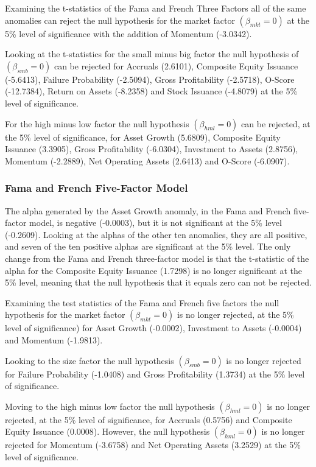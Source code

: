 \documentclass[12pt, a4paper, oneside]{article}
\begin{document}
Examining the t-statistics of the Fama and French Three Factors all of the same anomalies can reject the null hypothesis for the market factor $(\beta_{mkt}= 0)$ at the 5\% level of significance with the addition of Momentum (-3.0342). 

Looking at the t-statistics for the small minus big factor the null hypothesis of $(\beta_{smb}= 0)$ can be rejected for Accruals (2.6101), Composite Equity Issuance (-5.6413), Failure Probability (-2.5094), Gross Profitability (-2.5718), O-Score (-12.7384), Return on Assets (-8.2358) and Stock Issuance (-4.8079) at the 5\% level of significance. 

For the high minus low factor the null hypothesis $(\beta_{hml}= 0)$ can be rejected, at the 5\% level of significance, for Asset Growth (5.6809), Composite Equity Issuance (3.3905), Gross Profitability (-6.0304), Investment to Assets (2.8756), Momentum (-2.2889), Net Operating Assets (2.6413) and O-Score (-6.0907).

\subsubsection{Fama and French Five-Factor Model}
The alpha generated by the Asset Growth anomaly, in the Fama and French five-factor model, is negative (-0.0003), but it is not significant at the 5\% level (-0.2609). Looking at the alphas of the other ten anomalies, they are all positive, and seven of the ten positive alphas are significant at the 5\% level. The only change from the Fama and French three-factor model is that the t-statistic of the alpha for the Composite Equity Issuance (1.7298) is no longer significant at the 5\% level, meaning that the null hypothesis that it equals zero can not be rejected.

Examining the test statistics of the Fama and French five factors the null hypothesis for the market factor $(\beta_{mkt}= 0)$ is no longer rejected, at the 5\% level of significance) for Asset Growth (-0.0002), Investment to Assets (-0.0004) and Momentum (-1.9813). 

Looking to the size factor the null hypothesis $(\beta_{smb}= 0)$ is no longer rejected for Failure Probability (-1.0408) and Gross Profitability (1.3734) at the 5\% level of significance.

Moving to the high minus low factor the null hypothesis $(\beta_{hml}= 0)$ is no longer rejected, at the 5\% level of significance, for Accruals (0.5756) and Composite Equity Issuance (0.0008). However, the null hypothesis $(\beta_{hml}= 0)$ is no longer rejected for Momentum (-3.6758) and Net Operating Assets (3.2529) at the 5\% level of significance.
\end{document}
